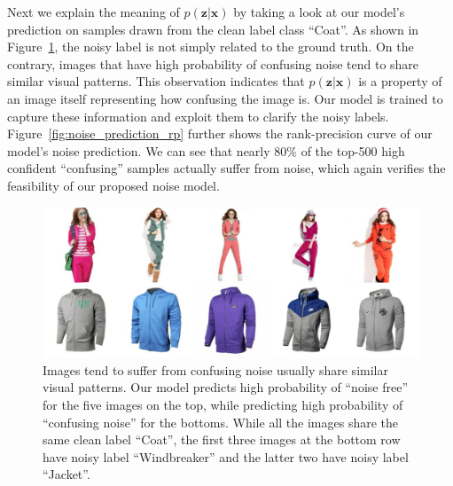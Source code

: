 \documentclass[10pt,twocolumn,letterpaper]{article}
\def\vec{\mathbf}
\begin{document}
Next we explain the meaning of $p(\vec{z}|\vec{x})$ by taking a look at our model's prediction on samples drawn from the clean label class ``Coat''. As shown in Figure~\ref{fig:noise_cluster}, the noisy label is not simply related to the ground truth. On the contrary, images that have high probability of confusing noise tend to share similar visual patterns. This observation indicates that $p(\vec{z}|\vec{x})$ is a property of an image itself representing how confusing the image is. Our model is trained to capture these information and exploit them to clarify the noisy labels. Figure~\ref{fig:noise_prediction_rp} further shows the rank-precision curve of our model's noise prediction. We can see that nearly $80\%$ of the top-500 high confident ``confusing'' samples actually suffer from noise, which again verifies the feasibility of our proposed noise model.

\begin{figure}[t]
\begin{center}
\includegraphics[width=1.0\linewidth]{figure/noise_cluster.pdf}
\end{center}
\caption{Images tend to suffer from confusing noise usually share similar visual patterns. Our model predicts high probability of ``noise free'' for the five images on the top, while predicting high probability of ``confusing noise'' for the bottoms. While all the images share the same clean label ``Coat'', the first three images at the bottom row have noisy label ``Windbreaker'' and the latter two have noisy label ``Jacket''.}
\label{fig:noise_cluster}
\end{figure}
\end{document}
